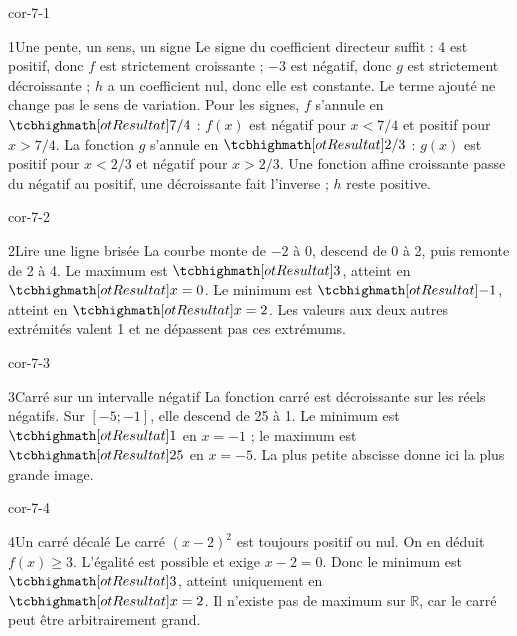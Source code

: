 \clearpage\pagestyle{otMain}\fontsize{11}{15}\selectfont
{}
\begin{blocLivre}{cor-7-1}
\begin{corrige}{1}{Une pente, un sens, un signe}
Le signe du coefficient directeur suffit : 4 est positif, donc $f$ est strictement croissante ; $-3$ est négatif, donc $g$ est strictement décroissante ; $h$ a un coefficient nul, donc elle est constante. Le terme ajouté ne change pas le sens de variation. Pour les signes, $f$ s’annule en $\res{7/4}$ : $f(x)$ est négatif pour $x<7/4$ et positif pour $x>7/4$. La fonction $g$ s’annule en $\res{2/3}$ : $g(x)$ est positif pour $x<2/3$ et négatif pour $x>2/3$. Une fonction affine croissante passe du négatif au positif, une décroissante fait l’inverse ; $h$ reste positive.
\end{corrige}
\end{blocLivre}
\begin{blocLivre}{cor-7-2}
\begin{corrige}{2}{Lire une ligne brisée}
La courbe monte de $-2$ à 0, descend de 0 à 2, puis remonte de 2 à 4. Le maximum est $\res3$, atteint en $\res{x=0}$. Le minimum est $\res{-1}$, atteint en $\res{x=2}$. Les valeurs aux deux autres extrémités valent 1 et ne dépassent pas ces extrémums.
\label{fig-cor-7-2}
\end{corrige}
\end{blocLivre}
\begin{blocLivre}{cor-7-3}
\begin{corrige}{3}{Carré sur un intervalle négatif}
La fonction carré est décroissante sur les réels négatifs. Sur $[-5;-1]$, elle descend de 25 à 1. Le minimum est $\res1$ en $x=-1$ ; le maximum est $\res{25}$ en $x=-5$. La plus petite abscisse donne ici la plus grande image.
\end{corrige}
\end{blocLivre}
\begin{blocLivre}{cor-7-4}
\begin{corrige}{4}{Un carré décalé}
Le carré $(x-2)^2$ est toujours positif ou nul. On en déduit $f(x)\ge3$. L’égalité est possible et exige $x-2=0$. Donc le minimum est $\res3$, atteint uniquement en $\res{x=2}$. Il n’existe pas de maximum sur $\mathbb R$, car le carré peut être arbitrairement grand.
\end{corrige}
\end{blocLivre}
